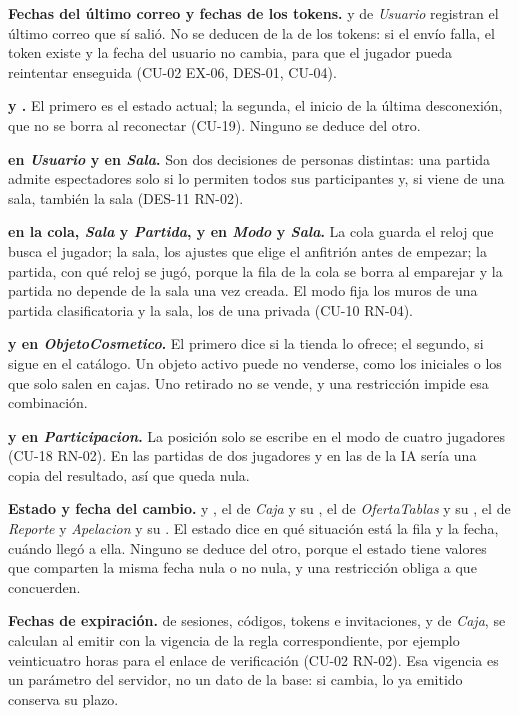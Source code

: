 \begin{reglas}
  \item \textbf{Fechas del último correo y fechas de los tokens.}  y  de \textit{Usuario} registran el último correo que sí salió. No se deducen de la  de los tokens: si el envío falla, el token existe y la fecha del usuario no cambia, para que el jugador pueda reintentar enseguida (\mbox{CU-02} \mbox{EX-06}, \mbox{DES-01}, \mbox{CU-04}).
  \item \textbf{ y .} El primero es el estado actual; la segunda, el inicio de la última desconexión, que no se borra al reconectar (\mbox{CU-19}). Ninguno se deduce del otro.
  \item \textbf{ en \textit{Usuario} y en \textit{Sala}.} Son dos decisiones de personas distintas: una partida admite espectadores solo si lo permiten todos sus participantes y, si viene de una sala, también la sala (\mbox{DES-11} \mbox{RN-02}).
  \item \textbf{ en la cola, \textit{Sala} y \textit{Partida}, y  en \textit{Modo} y \textit{Sala}.} La cola guarda el reloj que busca el jugador; la sala, los ajustes que elige el anfitrión antes de empezar; la partida, con qué reloj se jugó, porque la fila de la cola se borra al emparejar y la partida no depende de la sala una vez creada. El modo fija los muros de una partida clasificatoria y la sala, los de una privada (\mbox{CU-10} \mbox{RN-04}).
  \item \textbf{ y  en \textit{ObjetoCosmetico}.} El primero dice si la tienda lo ofrece; el segundo, si sigue en el catálogo. Un objeto activo puede no venderse, como los iniciales o los que solo salen en cajas. Uno retirado no se vende, y una restricción  impide esa combinación.
  \item \textbf{ y  en \textit{Participacion}.} La posición solo se escribe en el modo de cuatro jugadores (\mbox{CU-18} \mbox{RN-02}). En las partidas de dos jugadores y en las de la IA sería una copia del resultado, así que queda nula.
  \item \textbf{Estado y fecha del cambio.}  y , el  de \textit{Caja} y su , el de \textit{OfertaTablas} y su , el de \textit{Reporte} y \textit{Apelacion} y su . El estado dice en qué situación está la fila y la fecha, cuándo llegó a ella. Ninguno se deduce del otro, porque el estado tiene valores que comparten la misma fecha nula o no nula, y una restricción  obliga a que concuerden.
  \item \textbf{Fechas de expiración.}  de sesiones, códigos, tokens e invitaciones, y  de \textit{Caja}, se calculan al emitir con la vigencia de la regla correspondiente, por ejemplo veinticuatro horas para el enlace de verificación (\mbox{CU-02} \mbox{RN-02}). Esa vigencia es un parámetro del servidor, no un dato de la base: si cambia, lo ya emitido conserva su plazo.
\end{reglas}
